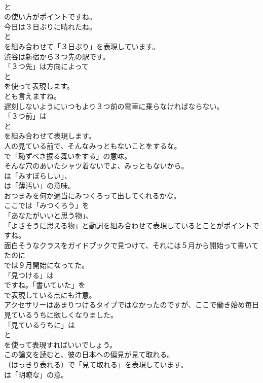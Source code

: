 \documentclass[8pt]{extreport}
\begin{document}
\begin{CJK}{UTF8}{min}
\\	と
\\	の使い方がポイントですね。	
\\	今日は３日ぶりに晴れたね。 
\\	と 
\\	を組み合わせて「３日ぶり」を表現しています。	
\\	渋谷は新宿から３つ先の駅です。 
\\	「３つ先」は方向によって
\\	と
\\	を使って表現します。
\\	とも言えますね。	
\\	遅刻しないようにいつもより３つ前の電車に乗らなければならない。 
\\	「３つ前」は
\\	と
\\	を組み合わせて表現します。	
\\	人の見ている前で、そんなみっともないことをするな。 
\\	で「恥ずべき振る舞いをする」の意味。	
\\	そんな穴のあいたシャツ着ないでよ、みっともないから。 
\\	は「みすぼらしい」、
\\	は「薄汚い」の意味。	
\\	おつまみを何か適当にみつくろって出してくれるかな。 
\\	ここでは「みつくろう」を
\\	「あなたがいいと思う物」、
\\	「よさそうに思える物」と動詞を組み合わせて表現しているとことがポイントですね。	
\\	面白そうなクラスをガイドブックで見つけて、それには５月から開始って書いてたのに 
\\	では９月開始になってた。 
\\	「見つける」は 
\\	ですね。「書いていた」を 
\\	で表現している点にも注意。	
\\	アクセサリーはあまりつけるタイプではなかったのですが、ここで働き始め毎日見ているうちに欲しくなりました。 
\\	「見ているうちに」は 
\\	と 
\\	を使って表現すればいいでしょう。	
\\	この論文を読むと、彼の日本への偏見が見て取れる。 
\\	（はっきり表れる）で「見て取れる」を表現しています。
\\	は「明瞭な」の意。	

\end{CJK}
\end{document}

